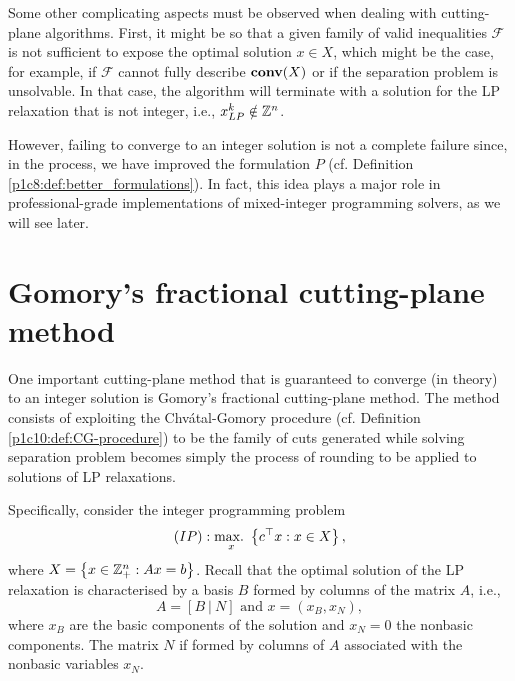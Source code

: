 Some other complicating aspects must be observed when dealing with cutting-plane algorithms. First, it might be so that a given family of valid inequalities $\mathcal{F}$ is not sufficient to expose the optimal solution $x \in X$, which might be the case, for example, if $\mathcal{F}$ cannot fully describe $\mathop{\bf conv}(X)$ or if the separation problem is unsolvable. In that case, the algorithm will terminate with a solution for the LP relaxation that is not integer, i.e., $x_{LP}^k \notin \mathbb{Z}^n$. 

However, failing to converge to an integer solution is not a complete failure since, in the process, we have improved the formulation $P$ (cf. Definition \ref{p1c8:def:better_formulations}). In fact, this idea plays a major role in professional-grade implementations of mixed-integer programming solvers, as we will see later. 


\section{Gomory's fractional cutting-plane method}

One important cutting-plane method that is guaranteed to converge (in theory) to an integer solution is Gomory's fractional cutting-plane method. The method consists of exploiting the Chv\'atal-Gomory procedure (cf. Definition \ref{p1c10:def:CG-procedure}) to be the family of cuts generated while solving separation problem becomes simply the process of rounding to be applied to solutions of LP relaxations. 

Specifically, consider the integer programming problem 
%
\begin{equation*}
	(IP): \mathop{\text{max.~}}_x\left\{ c^\top x : x \in X \right \},
\end{equation*}
%
where $X = \left\{ x \in \mathbb{Z}^n_+ : Ax = b \right \}$. Recall that the optimal solution of the LP relaxation is characterised by a basis $B$ formed by columns of the matrix $A$, i.e.,
%
\begin{equation*}
	A = [B ~|~ N] \text{ and } x = (x_B, x_N),	
\end{equation*}
%
where $x_B$ are the basic components of the solution and $x_N = 0$ the nonbasic components. The matrix $N$ if formed by columns of $A$ associated with the nonbasic variables $x_N$.

